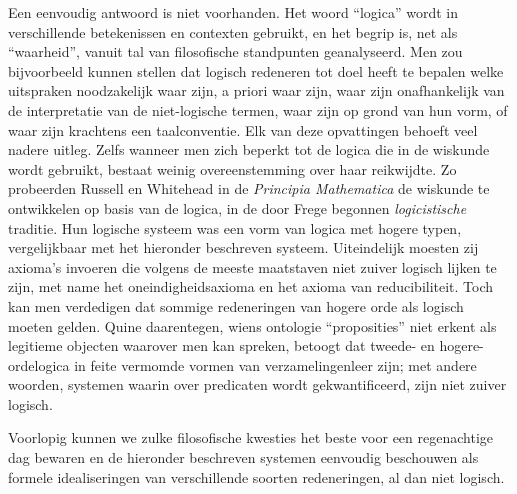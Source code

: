 \documentclass[openany]{memoir}
\begin{document}
Een eenvoudig antwoord is niet voorhanden. Het woord ``logica'' wordt
in verschillende betekenissen en contexten gebruikt, en het begrip is,
net als ``waarheid'', vanuit tal van filosofische standpunten
geanalyseerd. Men zou bijvoorbeeld kunnen stellen dat logisch redeneren
tot doel heeft te bepalen welke uitspraken noodzakelijk waar zijn, a
priori waar zijn, waar zijn onafhankelijk van de interpretatie van de
niet-logische termen, waar zijn op grond van hun vorm, of waar zijn
krachtens een taalconventie. Elk van deze opvattingen behoeft veel
nadere uitleg. Zelfs wanneer men zich beperkt tot de logica die in de
wiskunde wordt gebruikt, bestaat weinig overeenstemming over haar
reikwijdte. Zo probeerden Russell en Whitehead in de
\textit{Principia Mathematica} de wiskunde te ontwikkelen op basis van
de logica, in de door Frege begonnen {\em logicistische} traditie. Hun
logische systeem was een vorm van logica met hogere typen, vergelijkbaar
met het hieronder beschreven systeem. Uiteindelijk moesten zij axioma's
invoeren die volgens de meeste maatstaven niet zuiver logisch lijken te
zijn, met name het oneindigheidsaxioma en het axioma van reducibiliteit.
Toch kan men verdedigen dat sommige redeneringen van hogere orde als
logisch moeten gelden. Quine daarentegen, wiens ontologie
``proposities'' niet erkent als legitieme objecten waarover men kan
spreken, betoogt dat tweede- en hogere-ordelogica in feite vermomde
vormen van verzamelingenleer zijn; met andere woorden, systemen waarin
over predicaten wordt gekwantificeerd, zijn niet zuiver logisch.

Voorlopig kunnen we zulke filosofische kwesties het beste voor een
regenachtige dag bewaren en de hieronder beschreven systemen eenvoudig
beschouwen als formele idealiseringen van verschillende soorten
redeneringen, al dan niet logisch.
\endgroup

\begingroup
\def\olfilename{OLP-0176}
\def\olfilepath{content/first-order-logic/beyond/}
\hypertarget{unit-OLP-0176}{}



\end{document}
